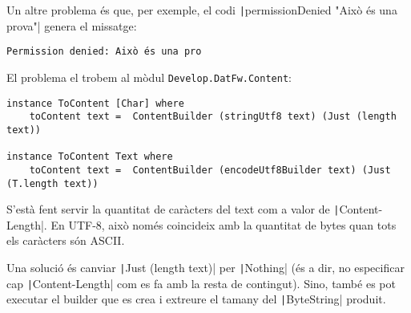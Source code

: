 \documentclass[catalan, a4paper]{scrartcl}
\begin{document}
Un altre problema és que, per exemple, el codi
\texttt|permissionDenied "Això és una prova"|
genera el missatge:

\begin{verbatim}
Permission denied: Això és una pro
\end{verbatim}

El problema el trobem al mòdul \texttt{Develop.DatFw.Content}:

\begin{verbatim}
instance ToContent [Char] where
    toContent text =  ContentBuilder (stringUtf8 text) (Just (length text))

instance ToContent Text where
    toContent text =  ContentBuilder (encodeUtf8Builder text) (Just (T.length text))
\end{verbatim}

S'està fent servir la quantitat de caràcters del text com a valor de
\texttt|Content-Length|.
En UTF-8, això només coincideix amb la quantitat de bytes quan tots
els caràcters són ASCII.

Una solució és canviar
\texttt|Just (length text)| per \texttt|Nothing|
(és a dir, no especificar cap \texttt|Content-Length| com es fa amb la resta
de contingut). Sino, també es pot executar el builder que es crea i extreure
el tamany del \texttt|ByteString| produit.
\end{document}
